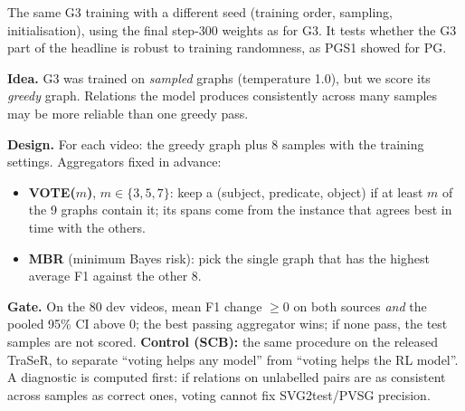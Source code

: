 \documentclass[11pt,openany]{book}
\begin{document}
\begin{pendingbox}
The same G3 training with a different seed (training order, sampling, initialisation), using the final step-300 weights as for G3.
It tests whether the G3 part of the headline is robust to training randomness, as PGS1 showed for PG.
\end{pendingbox}

\begin{pendingbox}
\textbf{Idea.} G3 was trained on \emph{sampled} graphs (temperature 1.0), but we score its \emph{greedy} graph. Relations the model
produces consistently across many samples may be more reliable than one greedy pass.

\textbf{Design.} For each video: the greedy graph plus 8 samples with the training settings. Aggregators fixed in advance:
\begin{itemize}
  \item \textbf{VOTE($m$)}, $m\in\{3,5,7\}$: keep a (subject, predicate, object) if at least $m$ of the 9 graphs contain it; its spans
  come from the instance that agrees best in time with the others.
  \item \textbf{MBR} (minimum Bayes risk): pick the single graph that has the highest average F1 against the other 8.
\end{itemize}
\textbf{Gate.} On the 80 dev videos, mean F1 change $\ge 0$ on both sources \emph{and} the pooled 95\% CI above 0; the best passing
aggregator wins; if none pass, the test samples are not scored. \textbf{Control (SCB):} the same procedure on the released TraSeR, to
separate ``voting helps any model'' from ``voting helps the RL model''. A diagnostic is computed first: if relations on unlabelled
pairs are as consistent across samples as correct ones, voting cannot fix SVG2test/PVSG precision.
\end{pendingbox}
\end{document}
